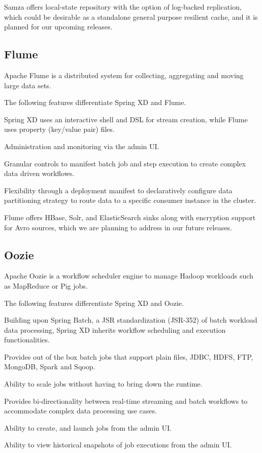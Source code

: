 Samza offers local-state repository with the option of log-backed replication,
which could be desirable as a standalone general purpose resilient cache, and it
is planned for our upcoming releases.

\subsection{Flume}
Apache Flume\cite{flume} is a distributed system for collecting, aggregating and
moving large data sets.

The following features differentiate Spring XD and Flume.

\begin{itemize*}
\item Spring XD uses an interactive shell and DSL for stream creation,
while Flume uses property (key/value pair) files.
\item Administration and monitoring via the admin UI.
\item Granular controls to manifest batch job and step execution to create
complex data driven workflows.
\item Flexibility through a deployment manifest to declaratively configure data
partitioning strategy to route data to a specific consumer instance in the cluster.
\end{itemize*}

Flume offers HBase, Solr, and ElasticSearch sinks along with encryption support
for Avro sources, which we are planning to address in our future releases.

\subsection{Oozie}
Apache Oozie\cite{oozie} is a workflow scheduler engine to manage Hadoop \cite{hadoop}
workloads such as MapReduce or Pig jobs.

The following features differentiate Spring XD and Oozie.

\begin{itemize*}
\item Building upon Spring Batch, a JSR standardization (JSR-352) of batch
workload data processing, Spring XD inherits workflow scheduling and execution
functionalities.
\item Provides out of the box batch jobs that support plain files, JDBC, HDFS,
FTP, MongoDB, Spark and Sqoop.
\item Ability to scale jobs without having to bring down the runtime.
\item Provides bi-directionality between real-time streaming and batch
workflows to accommodate complex data processing use cases.
\item Ability to create, and launch jobs from the admin UI.
\item Ability to view historical snapshots of job executions from the admin UI.
\end{itemize*}

